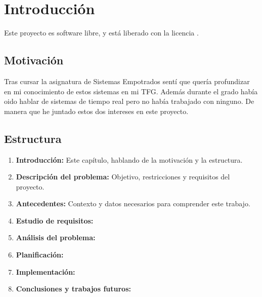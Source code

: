 \chapter{Introducción}

Este proyecto es software libre, y está liberado con la licencia \cite{gplv3}.

\section{Motivación}
Tras cursar la asignatura de Sistemas Empotrados sentí que quería profundizar en mi conocimiento de estos sistemas en mi TFG. Además durante el grado había oido hablar de sistemas de tiempo real pero no había trabajado con ninguno. De manera que he juntado estos dos intereses en este proyecto.

\section{Estructura}
\begin{enumerate}
    \item \textbf{Introducción:} Este capítulo, hablando de la motivación y la estructura.
    \item \textbf{Descripción del problema:} Objetivo, restricciones y requisitos del proyecto.
    \item \textbf{Antecedentes:} Contexto y datos necesarios para comprender este trabajo.
    \item \textbf{Estudio de requisitos:} 
    \item \textbf{Análisis del problema:}
    \item \textbf{Planificación:}
    \item \textbf{Implementación:} 
    \item \textbf{Conclusiones y trabajos futuros:}
\end{enumerate}
